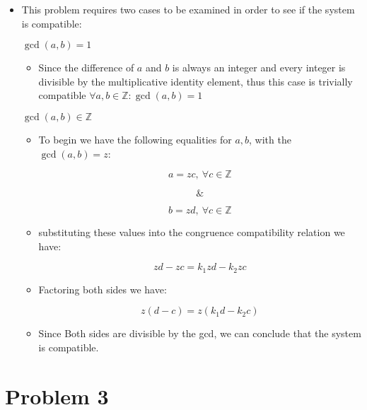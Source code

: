 \documentclass[]{report}
\begin{document}
\begin{itemize}
	\item This problem requires two cases to be examined in order to see if the  system is compatible:
	
	\subitem[1.] $\gcd(a, b) = 1$
	
	\begin{itemize}
		\item Since the difference of $a$ and $b$ is always an integer and every integer is divisible by the  multiplicative identity element, thus this case is trivially compatible $\forall a, b \in \mathbb{Z}: \gcd(a,b) = 1$
	\end{itemize}
	
	\subitem[2.] $\gcd(a, b) \in \mathbb{Z}$
	
	
	\begin{itemize}
		\item To begin we have the following equalities for $a, b$, with the $\gcd(a, b) = z$:
		
		$$ a = zc, \ \forall c \in \mathbb{Z} $$
		
		$$ \& $$
		
		$$ b = zd, \ \forall c \in \mathbb{Z} $$
		
		
		
		\item substituting these values into the congruence compatibility relation we have:
		
		
		$$ zd -zc = k_1 zd - k_2 zc $$
		
		
		\item Factoring both sides we have:
		
		$$ z(d -c) = z(k_1 d - k_2 c) $$
		
		
		\item  Since Both sides are divisible by the gcd, we can conclude that the system is compatible.
		
		
		
		
		
		
		
		
		
	\end{itemize}
	
	
	
	
\end{itemize}



\newpage


\section{Problem 3}
\end{document}
